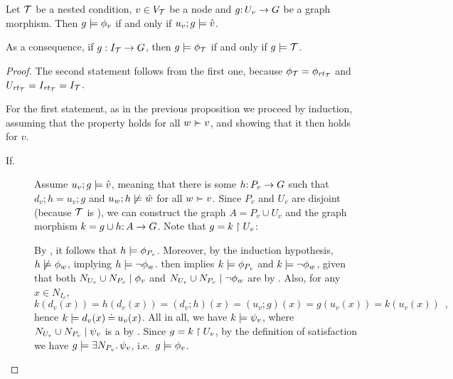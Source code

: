 \begin{theorem}
	\label{th:comparing satisfactions}
	Let ${\mathcal{T}}$ be a {\proper} nested condition, $v \in V_{\mathcal{T}}$ be a node and $g{:}\, U_v \rightarrow G$ be a graph morphism. Then $g\models \phi_v$ if and only if $u_v;g\models \hat v$. 
	
	As a consequence, if $g: I_{\mathcal{T}} \rightarrow G$, then $g\models\phi_{\mathcal{T}}$ if and only if $g\models{\mathcal{T}}$.
\end{theorem}
%
\begin{proof}
	The second statement follows from the first one, because $\phi_{\mathcal{T}} = \phi_{\mathit{rt}_{{\mathcal{T}}}}$ and $U_{\mathit{rt}_{{\mathcal{T}}}} = I_{\mathit{rt}_{{\mathcal{T}}}} = I_{\mathcal{T}}$.
%

For the first statement, as in the previous proposition we proceed by induction, assuming that the property holds for all $w\childof v$, and showing that it then holds for $v$.
%
\begin{description}
\item[If.] Assume $u_v;g\models \hat v$, meaning that there is some $h{:}\, P_v\rightarrow G$ such that $d_v;h=u_v;g$ and $u_w;h\not\models \hat w$ for all $w\childof v$. Since $P_v$ and $U_v$ are disjoint (because ${\mathcal{T}}$ is \proper), we can construct the graph $A=P_v\cup U_v$ and the graph morphism $k=g\cup h{:}\, A\rightarrow G$. Note that 
$g = k \restriction U_v$: 

\smallskip
By ,  it follows that $h\models \phi_{P_v}$. Moreover, by the induction hypothesis, $h\not\models \phi_w$, implying $h\models\neg \phi_w$.  then implies $k\models \phi_{P_v}$ and $k\models \neg\phi_w$, given that both ${N_{U_v} \cup N_{P_v}} \mid {\phi_v}$ and ${N_{U_v} \cup N_{P_v}} \mid {\neg \phi_w}$ are {\cfors} by .  Also, for any $x\in N_{I_v}$,
\[ k(d_v(x))=h(d_v(x))=(d_v;h)(x) = (u_v;g)(x) = g(u_v(x))=k(u_v(x)) \enspace, \]
hence $k\models d_v(x)\mathbin{\doteq} u_v(x)$. All in all, we have $k\models \psi_v$, where ${N_{U_v} \cup N_{P_v}} \mid {\psi_v}$ is a {\cfor} by . Since $g = k \restriction U_v$, by the definition of satisfaction we have  $g\models \exists N_{P_v}.\, \psi_v$, i.e.\ $g\models \phi_v$. 


\end{description}
\end{proof}
